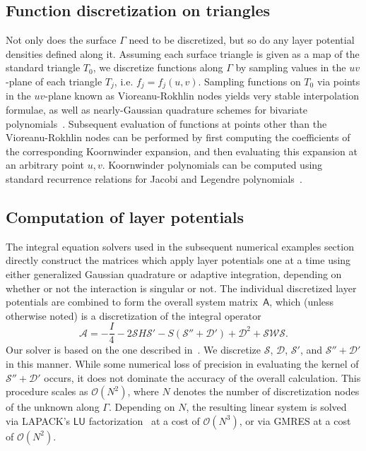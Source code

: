 \documentclass[11pt]{article}
\newcommand{\mtx}[1]{\bm{\mathsf{#1}}}
\newcommand{\cA}{\mathcal A}
\newcommand{\cS}{\mathcal S}
\newcommand{\cD}{\mathcal D}
\newcommand{\cW}{\mathcal W}
\numberwithin{equation}{section}
\begin{document}
\subsection{Function discretization on triangles}

Not only does the surface $\Gamma$ need to be discretized, but so do
any layer potential densities defined along it. Assuming each surface
triangle is given as a map of the standard triangle $T_0$, we
discretize functions along $\Gamma$ by sampling values in the $uv$-plane
of each triangle $T_j$, i.e. $f_j = f_j(u,v)$. Sampling functions on
$T_0$ via points in the $uv$-plane
known as Vioreanu-Rokhlin nodes yields very stable
interpolation formulae, as well as nearly-Gaussian quadrature schemes
for bivariate polynomials~\cite{vioreanu_2014}. 
Subsequent evaluation of functions at points other than the
Vioreanu-Rokhlin nodes can be performed by first computing the
coefficients of the corresponding Koornwinder expansion, and then
evaluating this expansion at an arbitrary point $u,v$. Koornwinder
polynomials can be computed using standard recurrence relations for
Jacobi and Legendre polynomials~\cite{nist}.










\subsection{Computation of layer potentials}
\label{sec_laypot}

The integral equation
solvers used in the subsequent numerical examples section
directly construct the matrices which apply layer potentials
one at a time using either generalized Gaussian
quadrature or adaptive integration, depending on whether or not the
interaction is singular or not.
The individual discretized layer potentials are combined to form the
overall system matrix~$\mtx{A}$, which (unless otherwise noted)
is a discretization of the integral
operator
\begin{equation}
  \cA = -\frac{I}{4} - 2\cS H \cS' - S\left( \cS'' + \cD' \right)
  + \cD^2 + \cS \cW \cS.
\end{equation}
Our solver is based on the one
described in~\cite{bremer_2012c}.
We discretize $\cS$, $\cD$, $\cS'$, and $\cS'' + \cD'$ in this manner.
While some numerical loss of precision in evaluating the kernel of
$\cS'' + \cD'$ occurs, it does not dominate the accuracy of
the overall calculation.
This procedure scales as $\mathcal O(N^2)$, where $N$ denotes the number of
discretization nodes of the unknown along $\Gamma$. Depending on $N$,
the resulting linear system is solved via LAPACK's $\mtx{LU}$
factorization~\cite{lapack} at a cost of $\mathcal O(N^3)$, or via
GMRES at a cost of $\mathcal O(N^2)$. 
\end{document}
